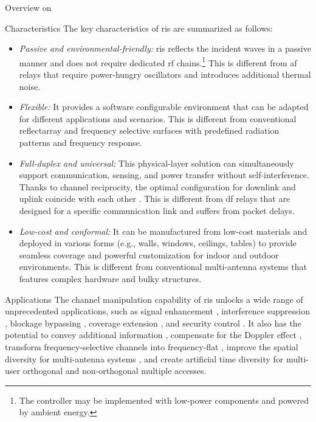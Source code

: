 \begin{section}{Overview on }
	\begin{subsection}{Characteristics}
		The key characteristics of \gls{ris} are summarized as follows:
		\begin{itemize}
			\item \emph{Passive and environmental-friendly:} \gls{ris} reflects the incident waves in a passive manner and does not require dedicated \gls{rf} chains.\footnote{The controller may be implemented with low-power components and powered by ambient energy.} This is different from \gls{af} relays that require power-hungry oscillators and introduces additional thermal noise.
			\item \emph{Flexible:} It provides a software configurable environment that can be adapted for different applications and scenarios. This is different from conventional reflectarray \cite{Nayeri2018} and frequency selective surfaces \cite{Anwar2018} with predefined radiation patterns and frequency response.
			\item \emph{Full-duplex and universal:} This physical-layer solution can simultaneously support communication, sensing, and power transfer without self-interference. Thanks to channel reciprocity, the optimal configuration for downlink and uplink coincide with each other \cite{Wu2021}. This is different from \gls{df} relays that are designed for a specific communication link and suffers from packet delays.
			\item \emph{Low-cost and conformal:} It can be manufactured from low-cost materials and deployed in various forms (e.g., walls, windows, ceilings, tables) to provide seamless coverage and powerful customization for indoor and outdoor environments. This is different from conventional multi-antenna systems that features complex hardware and bulky structures.
		\end{itemize}
	\end{subsection}

	\begin{subsection}{Applications}\label{sc:ris_applications}
		The channel manipulation capability of \gls{ris} unlocks a wide range of unprecedented applications, such as signal enhancement \cite{Wu2019}, interference suppression \cite{Jiang2022}, blockage bypassing \cite{Ghatak2021}, coverage extension \cite{Zeng2021}, and security control \cite{Almohamad2020}.
		It also has the potential to convey additional information \cite{Ye2022}, compensate for the Doppler effect \cite{Basar2021}, transform frequency-selective channels into frequency-flat \cite{Arslan2022}, improve the spatial diversity for multi-antenna systems \cite{Ozdogan2020a}, and create artificial time diversity for multi-user orthogonal \cite{Yang2019} and non-orthogonal \cite{Chen2023} multiple accesses.


\end{subsection}
\end{section}
